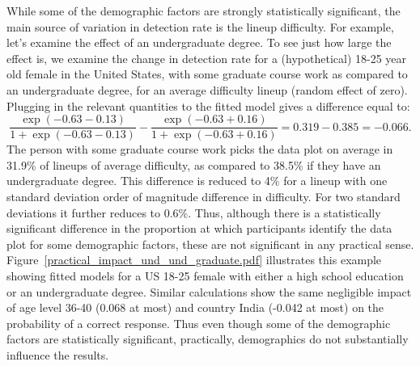 \documentclass[10pt]{article}\usepackage[]{graphicx}\usepackage[]{xcolor}
\begin{document}
While some of the demographic factors are strongly statistically significant, the main source of variation in detection rate is the lineup difficulty. For example, let's examine the effect of an undergraduate degree. To see just how large the effect is, we examine the change in detection rate for a (hypothetical) 18-25 year old female in the United States, with some graduate course work as compared to an undergraduate degree, for an average difficulty lineup (random effect of zero). Plugging in the relevant quantities to the fitted model gives a difference equal to:
$$ \frac {\exp(-0.63-0.13)}{1+\exp(-0.63-0.13)}-  \frac {\exp(-0.63+0.16)}{1+\exp(-0.63+0.16)} = 0.319- 0.385 =-0.066.$$ 
The person with some graduate course work picks the data plot  on average in 31.9\% of lineups of average difficulty, as compared to 38.5\% if they have an undergraduate degree. This difference is reduced to 4\% for a lineup with one standard deviation order of magnitude difference in difficulty. For two standard deviations it further reduces to 0.6\%. Thus, although there is a statistically significant difference in the proportion at which participants identify the  data plot for some demographic factors, these are not  significant in any practical sense.  Figure~\ref{practical_impact_und_und_graduate.pdf} illustrates this example showing fitted models for a US 18-25 female with either a high school education or an undergraduate degree.  Similar calculations show the same negligible impact of age level 36-40 (0.068 at most)  and country India (-0.042 at most) on the probability of a correct response. Thus even though some of the demographic factors are statistically significant, practically, demographics do not substantially influence the results. 
\end{document}

